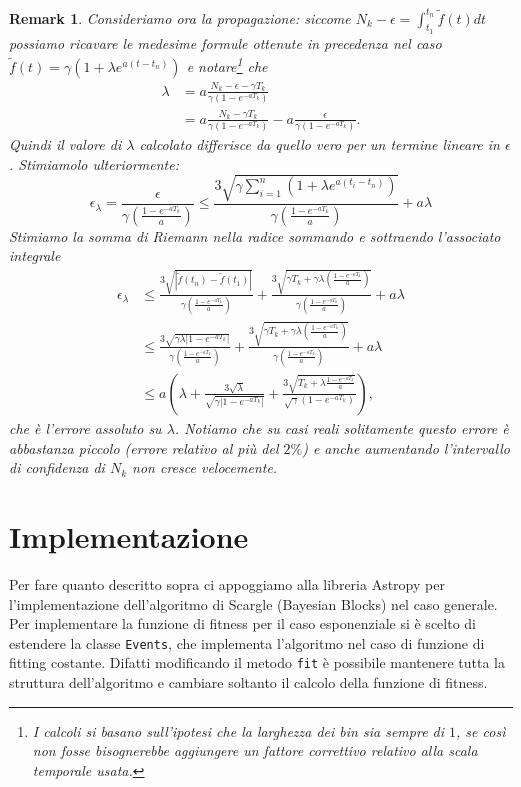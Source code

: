 \documentclass[10pt,a4paper]{report}
\newtheorem{remark}{Remark}
\begin{document}
\begin{remark}
Consideriamo ora la propagazione: siccome $N_k- \epsilon = \int_{t_1}^{t_n}\tilde{f}(t)dt$ possiamo ricavare le medesime formule ottenute in precedenza nel caso $\tilde{f}(t)=\gamma(1+\lambda e^{a(t-t_n)})$ e notare\footnote{I calcoli si basano sull'ipotesi che la larghezza dei bin sia sempre di $1$, se così non fosse bisognerebbe aggiungere un fattore correttivo relativo alla scala temporale usata.} che
\begin{align*}
\lambda &= a\frac{N_k-\epsilon-\gamma T_k}{\gamma(1-e^{-aT_k})}\\
&= a\frac{N_k-\gamma T_k}{\gamma(1-e^{-aT_k})} - a\frac{\epsilon}{\gamma(1-e^{-aT_k})}.
\end{align*}
Quindi il valore di $\lambda$ calcolato differisce da quello vero per un termine lineare in $\epsilon$. Stimiamolo ulteriormente:
$$
\epsilon_{\lambda}=\frac{\epsilon}{\gamma\left(\frac{1-e^{-aT_k}}{a}\right)}\leq \frac{3\sqrt{\gamma\sum_{i=1}^n(1+\lambda e^{a(t_i-t_n)})}}{\gamma\left(\frac{1-e^{-aT_k}}{a}\right)} + a\lambda
$$
Stimiamo la somma di Riemann nella radice sommando e sottraendo l'associato integrale
\begin{align*}
\epsilon_{\lambda}&\leq \frac{3\sqrt{|\tilde{f}(t_n)-\tilde{f}(t_1)|}}{\gamma\left(\frac{1-e^{-aT_k}}{a}\right)} + \frac{3\sqrt{\gamma T_k + \gamma\lambda\left(\frac{1-e^{-aT_k}}{a}\right)}}{\gamma\left(\frac{1-e^{-aT_k}}{a}\right)}+a\lambda\\
&\leq \frac{3\sqrt{\gamma\lambda|1-e^{-aT_k}|}}{\gamma\left(\frac{1-e^{-aT_k}}{a}\right)} + \frac{3\sqrt{\gamma T_k + \gamma\lambda\left(\frac{1-e^{-aT_k}}{a}\right)}}{\gamma\left(\frac{1-e^{-aT_k}}{a}\right)}+a\lambda\\
&\leq a\left(\lambda+\frac{3\sqrt{\lambda}}{\sqrt{\gamma|1-e^{-aT_k}|}}+\frac{3\sqrt{T_k+\lambda\frac{1-e^{-aT_k}}{a}}}{\sqrt{\gamma}(1-e^{-aT_k})}\right),
\end{align*}
che è l'errore assoluto su $\lambda$. Notiamo che su casi reali solitamente questo errore è abbastanza piccolo (errore relativo al più del $2\%$) e anche aumentando l'intervallo di confidenza di $N_k$ non cresce velocemente.
\end{remark}
\section{Implementazione}
Per fare quanto descritto sopra ci appoggiamo alla libreria Astropy per l'implementazione dell'algoritmo di Scargle (Bayesian Blocks) nel caso generale. Per implementare la funzione di fitness per il caso esponenziale si è scelto di estendere la classe \texttt{Events}, che implementa l'algoritmo nel caso di funzione di fitting costante. Difatti modificando il metodo \texttt{fit} è possibile mantenere tutta la struttura dell'algoritmo e cambiare soltanto il calcolo della funzione di fitness.
\end{document}
